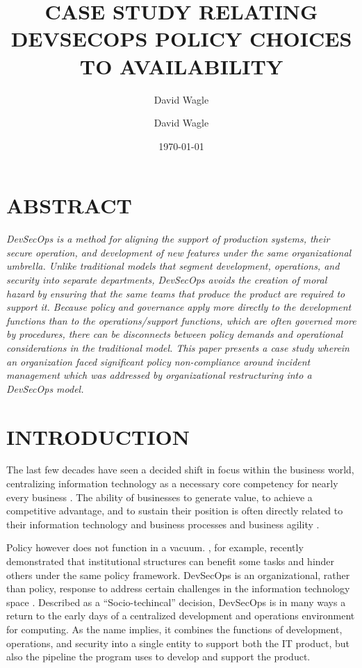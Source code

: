 \documentclass[doc]{apa7}
\author{David Wagle}
\affiliation{School of Business, Northcentral University}
\author{David Wagle}
\date{\today}
\title{CASE STUDY RELATING DEVSECOPS POLICY CHOICES TO AVAILABILITY}
\begin{document}
\maketitle

\section{ABSTRACT}
\label{sec:org8b33f00}

\emph{DevSecOps is a method for aligning the support of production systems, their secure operation, and development of new features under the same organizational umbrella. Unlike traditional models that segment development, operations, and security into separate departments, DevSecOps avoids the creation of moral hazard by ensuring that the same teams that produce the product are required to support it. Because policy and governance apply more directly to the development functions than to the operations/support functions, which are often governed more by procedures, there can be disconnects between policy demands and operational considerations in the traditional model. This paper presents a case study wherein an organization faced significant policy non-compliance around incident management which was addressed by organizational restructuring into a DevSecOps model.}

\section{INTRODUCTION}
\label{sec:orgcaf5265}

The last few decades have seen a decided shift in focus within the business world, centralizing information technology as a necessary core competency for nearly every business \citep{walkerAllCompaniesAre2018}. The ability of businesses to generate value, to achieve a competitive advantage, and to sustain their position is often directly related to their information technology and business processes and business agility \citep{gautamCapabilitiesBusinessProcesses2004,luUnderstandingLinkInformation2011,chengFacilitatingSpeedInternationalization2020}.

Policy however does not function in a vacuum. \citet{zhangInstitutionalStructuringInnovation2020}, for example, recently demonstrated that institutional structures can benefit some tasks and hinder others under the same policy framework. DevSecOps is an organizational, rather than policy, response to address certain challenges in the information technology space \cite{carolwoodyDevSecOpsPipelineComplex2020}. Described as a ``Socio-techincal'' decision, DevSecOps is in many ways a return to the early days of a centralized development and operations environment for computing. As the name implies, it combines the functions of development, operations, and security into a single entity to support both the IT product, but also the pipeline the program uses to develop and support the product.
\end{document}
